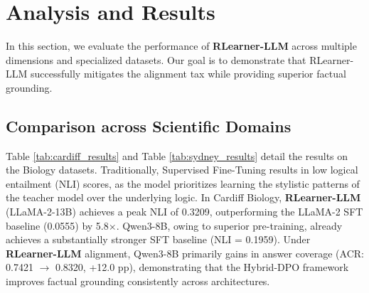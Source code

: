 \section{Analysis and Results}

In this section, we evaluate the performance of \textbf{RLearner-LLM} across multiple dimensions and specialized datasets. Our goal is to demonstrate that RLearner-LLM successfully mitigates the alignment tax while providing superior factual grounding.

\subsection{Comparison across Scientific Domains}
Table \ref{tab:cardiff_results} and Table \ref{tab:sydney_results} detail the results on the Biology datasets. Traditionally, Supervised Fine-Tuning results in low logical entailment (NLI) scores, as the model prioritizes learning the stylistic patterns of the teacher model over the underlying logic. In Cardiff Biology, \textbf{RLearner-LLM} (LLaMA-2-13B) achieves a peak NLI of 0.3209, outperforming the LLaMA-2 SFT baseline (0.0555) by 5.8$\times$. Qwen3-8B, owing to superior pre-training, already achieves a substantially stronger SFT baseline (NLI = 0.1959). Under \textbf{RLearner-LLM} alignment, Qwen3-8B primarily gains in answer coverage (ACR: 0.7421 $\rightarrow$ 0.8320, +12.0 pp), demonstrating that the Hybrid-DPO framework improves factual grounding consistently across architectures.

\begin{table}[h]
\centering
{}
\caption{Experimental performance on the Cardiff Biology dataset. LLaMA-2 RLearner-LLM achieves 5.8$\times$ NLI improvement over its SFT baseline. Qwen3-8B demonstrates a stronger SFT baseline and gains primarily in ACR (+12.0 pp) under Hybrid-DPO alignment.}
\label{tab:cardiff_results}
\end{table}

